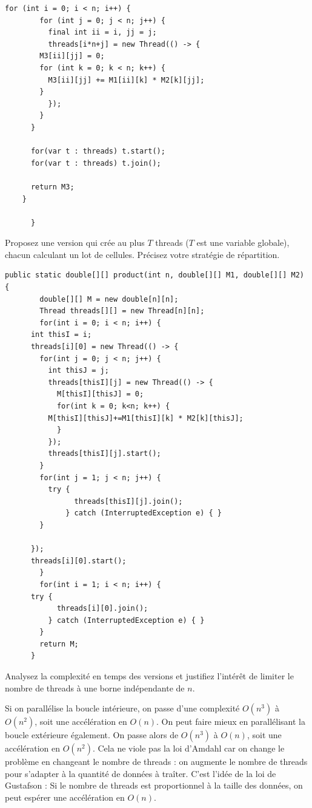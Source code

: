 \begin{exercice}[Parallélisation]
\begin{corrections}
\begin{lstlisting}[gobble=6]
	  for (int i = 0; i < n; i++) {
	    for (int j = 0; j < n; j++) {
	      final int ii = i, jj = j;
	      threads[i*n+j] = new Thread(() -> {
		M3[ii][jj] = 0;
		for (int k = 0; k < n; k++) {
		  M3[ii][jj] += M1[ii][k] * M2[k][jj];
		}
	      });
	    }
	  }

	  for(var t : threads) t.start();
	  for(var t : threads) t.join();

	  return M3;
	}

      }
    \end{lstlisting}
  \end{corrections}

  \begin{questions}
  \item Proposez une version qui crée au plus $T$ threads ($T$ est une variable globale), chacun calculant un lot de cellules.
    Précisez votre stratégie de répartition.
  \end{questions}
  \begin{corrections}
    \begin{lstlisting}[gobble=6]
      public static double[][] product(int n, double[][] M1, double[][] M2) {
        double[][] M = new double[n][n];
        Thread threads[][] = new Thread[n][n];
        for(int i = 0; i < n; i++) {
	  int thisI = i;
	  threads[i][0] = new Thread(() -> {
	    for(int j = 0; j < n; j++) {
	      int thisJ = j;
	      threads[thisI][j] = new Thread(() -> {
	        M[thisI][thisJ] = 0;
	        for(int k = 0; k<n; k++) {
		  M[thisI][thisJ]+=M1[thisI][k] * M2[k][thisJ];
	        }
	      });
	      threads[thisI][j].start();
	    }
	    for(int j = 1; j < n; j++) {
	      try {
                threads[thisI][j].join();
              } catch (InterruptedException e) { }
	    }
	    
	  });
	  threads[i][0].start();
        }
        for(int i = 1; i < n; i++) {
	  try {
            threads[i][0].join();
          } catch (InterruptedException e) { }
        }
        return M;
      }
    \end{lstlisting}
  \end{corrections}

  \begin{questions}
  \item Analysez la complexité en temps des versions et justifiez l'intérêt
    de limiter le nombre de threads à une borne indépendante de $n$.
  \end{questions}
  \begin{corrections}
    Si on parallélise la boucle intérieure, on passe d'une complexité $O(n^3)$ à $O(n^2)$, soit une accélération en $O(n)$.
    On peut faire mieux en parallélisant la boucle extérieure également. On passe alors de $O(n^3)$ à $O(n)$, soit une accélération en $O(n^2)$.
    Cela ne viole pas la loi d'Amdahl car on change le problème en changeant le nombre de threads :
    on augmente le nombre de threads pour s'adapter à la quantité de données à traîter. C'est l'idée de la loi de Gustafson :
    Si le nombre de threads est proportionnel à la taille des données, on peut espérer une accélération en $O(n)$.
    

\end{corrections}
\end{exercice}
